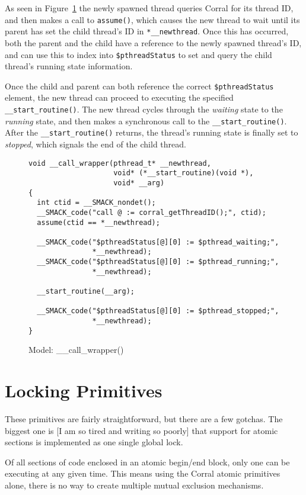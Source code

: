As seen in Figure~\ref{fig:__call_wrapper} the newly spawned thread
queries Corral for its thread ID, and then makes a call to
\lstinline|assume()|, which causes the new thread to wait until its
parent has set the child thread's ID in \lstinline|*__newthread|. Once
this has occurred, both the parent and the child have a reference to
the newly spawned thread's ID, and can use this to index into
\lstinline|$pthreadStatus| to set and query the child thread's running
state information. 

Once the child and parent can both reference the correct
\lstinline|$pthreadStatus| element, the new thread can proceed to
executing the specified \lstinline|__start_routine()|.  The new thread
cycles through the \emph{waiting} state to the \emph{running} state,
and then makes a synchronous call to the
\lstinline|__start_routine()|.  After the
\lstinline|__start_routine()| returns, the thread's running state is
finally set to \emph{stopped}, which signals the end of the child
thread. 

\begin{figure}[h]
\centering
\caption{Model: \_\_call\_wrapper()}\label{fig:__call_wrapper}
\begin{lstlisting}
void __call_wrapper(pthread_t* __newthread,
                    void* (*__start_routine)(void *),
                    void* __arg)
{
  int ctid = __SMACK_nondet();
  __SMACK_code("call @ := corral_getThreadID();", ctid);
  assume(ctid == *__newthread);
  
  __SMACK_code("$pthreadStatus[@][0] := $pthread_waiting;",
               *__newthread);
  __SMACK_code("$pthreadStatus[@][0] := $pthread_running;",
               *__newthread);

  __start_routine(__arg);

  __SMACK_code("$pthreadStatus[@][0] := $pthread_stopped;",
               *__newthread);
}
\end{lstlisting}
\end{figure}



\section{Locking Primitives}
These primitives are fairly straightforward, but there are a few
gotchas.  The biggest one is [I am so tired and writing so poorly]
that support for atomic sections is implemented as one single global
lock.   

Of all sections of code enclosed in an atomic begin/end block, only
one can be executing at any given time.  This means using the Corral
atomic primitives alone, there is no way to create multiple mutual
exclusion mechanisms. 

